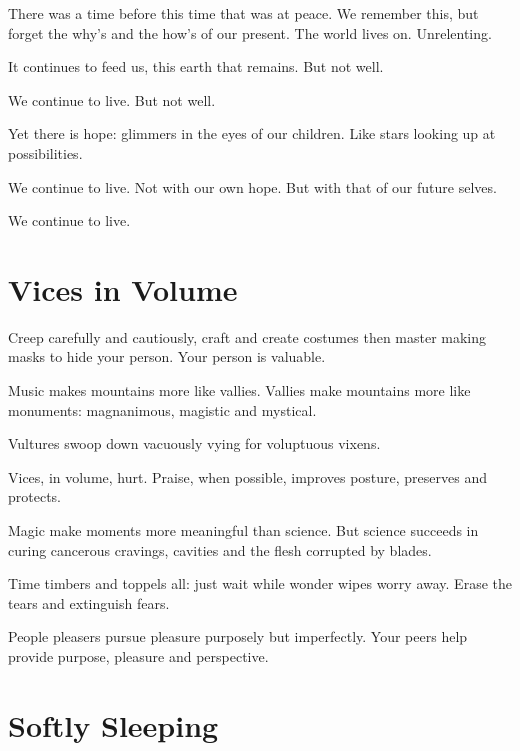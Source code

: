\documentclass[fontsize=12pt,english]{scrreprt}
\begin{document}
There was a time before this time that was at peace. We remember this,
but forget the why's and the how's of our present. The world lives
on. Unrelenting.

It continues to feed us, this earth that remains. But not well.

We continue to live. But not well.

Yet there is hope: glimmers in the eyes of our children. Like stars
looking up at possibilities.

We continue to live. Not with our own hope. But with that of our
future selves.

We continue to live.

\newpage

\section{Vices in Volume}


Creep carefully and cautiously, craft and create costumes then master
making masks to hide your person. Your person is valuable.



Music makes mountains more like vallies. Vallies make mountains more
like monuments: magnanimous, magistic and mystical.

Vultures swoop down vacuously vying for voluptuous vixens.

Vices, in volume, hurt. Praise, when possible, improves posture,
preserves and protects.

Magic make moments more meaningful than science. But science succeeds
in curing cancerous cravings, cavities and the flesh corrupted by
blades.

Time timbers and toppels all: just wait while wonder wipes worry
away. Erase the tears and extinguish fears.

People pleasers pursue pleasure purposely but imperfectly. Your peers
help provide purpose, pleasure and perspective.

\newpage

\section{Softly Sleeping}
\end{document}
